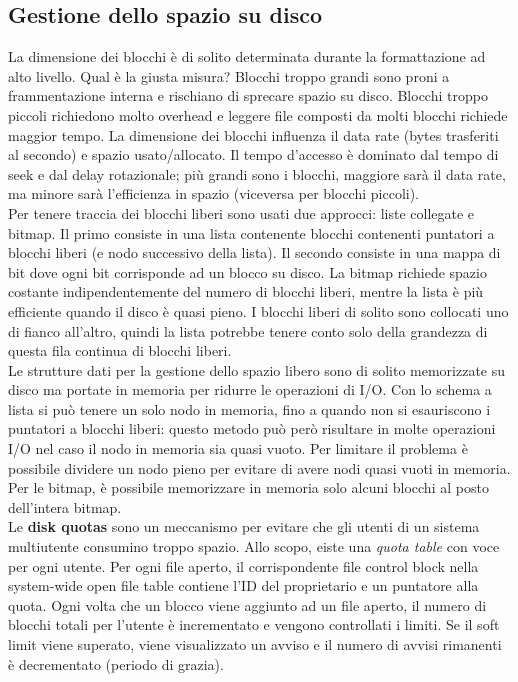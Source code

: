 \documentclass[12pt]{article}
\begin{document}
\subsection{Gestione dello spazio su disco}
La dimensione dei blocchi è di solito determinata durante la formattazione ad alto livello. Qual è la giusta misura?
Blocchi troppo grandi sono proni a frammentazione interna e rischiano di sprecare spazio su disco.
Blocchi troppo piccoli richiedono molto overhead e leggere file composti da molti blocchi richiede maggior tempo.
La dimensione dei blocchi influenza il data rate (bytes trasferiti al secondo) e spazio usato/allocato.
Il tempo d'accesso è dominato dal tempo di seek e dal delay rotazionale; più grandi sono i blocchi, maggiore sarà il
data rate, ma minore sarà l'efficienza in spazio (viceversa per blocchi piccoli).\\
Per tenere traccia dei blocchi liberi sono usati due approcci: liste collegate e bitmap. 
Il primo consiste in una lista contenente blocchi contenenti puntatori a blocchi liberi (e nodo successivo della lista).
Il secondo consiste in una mappa di bit dove ogni bit corrisponde ad un blocco su disco. La bitmap richiede spazio 
costante indipendentemente del numero di blocchi liberi, mentre la lista è più efficiente quando il disco è quasi pieno.
I blocchi liberi di solito sono collocati uno di fianco all'altro, quindi la lista potrebbe tenere conto solo della
grandezza di questa fila continua di blocchi liberi.\\
Le strutture dati per la gestione dello spazio libero sono di solito memorizzate su disco ma portate in memoria per 
ridurre le operazioni di I/O. Con lo schema a lista si può tenere un solo nodo in memoria, fino a quando non si
esauriscono i puntatori a blocchi liberi: questo metodo può però risultare in molte operazioni I/O nel caso il nodo in
memoria sia quasi vuoto. Per limitare il problema è possibile dividere un nodo pieno per evitare di avere nodi quasi
vuoti in memoria. Per le bitmap, è possibile memorizzare in memoria solo alcuni blocchi al posto dell'intera bitmap.\\
Le \textbf{disk quotas} sono un meccanismo per evitare che gli utenti di un sistema multiutente consumino troppo spazio.
Allo scopo, eiste una \textit{quota table} con voce per ogni utente. Per ogni file aperto, il corrispondente file 
control block nella system-wide open file table contiene l'ID del proprietario e un puntatore alla quota. Ogni volta
che un blocco viene aggiunto ad un file aperto, il numero di blocchi totali per l'utente è incrementato e vengono 
controllati i limiti. Se il soft limit viene superato, viene visualizzato un avviso e il numero di avvisi rimanenti è
decrementato (periodo di grazia). 
\end{document}
